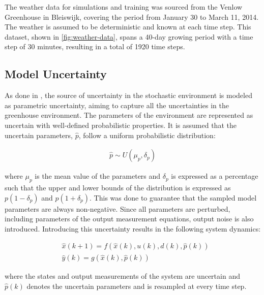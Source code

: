 The weather data for simulations and training was sourced from the Venlow Greenhouse in Bleiswijk, covering the period from January 30 to March 11, 2014. The weather is assumed to be deterministic and known at each time step. This dataset, shown in \autoref{fig:weather-data}, spans a 40-day growing period with a time step of 30 minutes, resulting in a total of 1920 time steps.



\subsection{Model Uncertainty}
As done in \cite{boersmaRobustSamplebasedModel2022, lubbersAutonomousGreenhouseClimate2023}, the source of uncertainty in the stochastic environment is modeled as parametric uncertainty, aiming to capture all the uncertainties in the greenhouse environment. The parameters of the environment are represented as uncertain with well-defined probabilistic properties. It is assumed that the uncertain parameters, $\hat{p}$, follow a uniform probabilistic distribution:

\begin{equation}
	\label{eq:uncertainty_model}
	\begin{aligned}
		\hat{p} \sim U(\mu_p, \delta_p)  
	\end{aligned}
\end{equation}

where $\mu_p$ is the mean value of the parameters and $\delta_p$ is expressed as a percentage such that the upper and lower bounds of the distribution is expressed as $p(1-\delta_p)$ and $p(1+\delta_p)$. This was done to guarantee that the sampled model parameters are always non-negative. Since all parameters are perturbed, including parameters of the output measurement equations, output noise is also introduced. Introducing this uncertainty results in the following system dynamics:

\begin{equation}\label{eq:greenhouse_model_discrete_uncertain}
	\begin{aligned}
		& \hat x(k+1) = f(\hat x(k),u(k),d(k),\hat p(k)) \\
		& \hat y(k) = g(\hat x(k),\hat p(k))
	\end{aligned}
\end{equation}

where the states and output measurements of the system are uncertain and $\hat{p}(k)$ denotes the uncertain parameters and is resampled at every time step.

